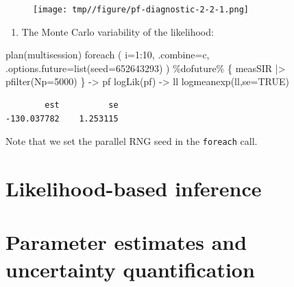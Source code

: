 \documentclass[
  letterpaper,
  DIV=11,
  numbers=noendperiod]{scrartcl}
\newenvironment{Shaded}{\begin{snugshade}}{\end{snugshade}}
\newcommand{\AttributeTok}[1]{\textcolor[rgb]{0.40,0.45,0.13}{#1}}
\newcommand{\ConstantTok}[1]{\textcolor[rgb]{0.56,0.35,0.01}{#1}}
\newcommand{\DecValTok}[1]{\textcolor[rgb]{0.68,0.00,0.00}{#1}}
\newcommand{\FunctionTok}[1]{\textcolor[rgb]{0.28,0.35,0.67}{#1}}
\newcommand{\NormalTok}[1]{\textcolor[rgb]{0.00,0.23,0.31}{#1}}
\newcommand{\OtherTok}[1]{\textcolor[rgb]{0.00,0.23,0.31}{#1}}
\newcommand{\SpecialCharTok}[1]{\textcolor[rgb]{0.37,0.37,0.37}{#1}}
\providecommand{\tightlist}{%
  \setlength{\itemsep}{0pt}\setlength{\parskip}{0pt}}\usepackage{longtable,booktabs,array}
\begin{document}
\vspace{-10mm}

\begin{figure}[h!]

{\centering \texttt{[image: tmp//figure/pf-diagnostic-2-2-1.png]}

}

\end{figure}

\framebreak

\begin{enumerate}
\def\labelenumi{\arabic{enumi}.}
\setcounter{enumi}{2}
\tightlist
\item
  The Monte Carlo variability of the likelihood:
\end{enumerate}

\begin{Shaded}
\begin{Highlighting}[]
\FunctionTok{plan}\NormalTok{(multisession)}
\FunctionTok{foreach}\NormalTok{ (}
  \AttributeTok{i=}\DecValTok{1}\SpecialCharTok{:}\DecValTok{10}\NormalTok{, }\AttributeTok{.combine=}\NormalTok{c, }\AttributeTok{.options.future=}\FunctionTok{list}\NormalTok{(}\AttributeTok{seed=}\DecValTok{652643293}\NormalTok{)}
\NormalTok{) }\SpecialCharTok{\%dofuture\%}\NormalTok{ \{}
\NormalTok{    measSIR }\SpecialCharTok{|\textgreater{}} \FunctionTok{pfilter}\NormalTok{(}\AttributeTok{Np=}\DecValTok{5000}\NormalTok{)}
\NormalTok{\} }\OtherTok{{-}\textgreater{}}\NormalTok{ pf}
\FunctionTok{logLik}\NormalTok{(pf) }\OtherTok{{-}\textgreater{}}\NormalTok{ ll}
\FunctionTok{logmeanexp}\NormalTok{(ll,}\AttributeTok{se=}\ConstantTok{TRUE}\NormalTok{)}
\end{Highlighting}
\end{Shaded}

\begin{verbatim}
        est          se 
-130.037782    1.253115 
\end{verbatim}

Note that we set the parallel RNG seed in the \texttt{foreach} call.

\hypertarget{likelihood-based-inference}{%
\section{Likelihood-based inference}\label{likelihood-based-inference}}

\hypertarget{parameter-estimates-and-uncertainty-quantification}{%
\section{Parameter estimates and uncertainty
quantification}\label{parameter-estimates-and-uncertainty-quantification}}
\end{document}
